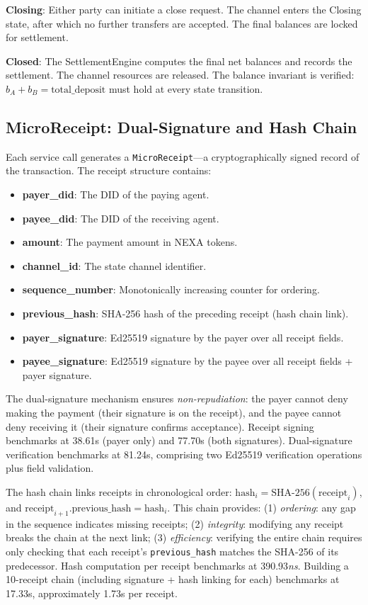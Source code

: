 \textbf{Closing}: Either party can initiate a close request. The channel enters the Closing state, after which no further transfers are accepted. The final balances are locked for settlement.

\textbf{Closed}: The SettlementEngine computes the final net balances and records the settlement. The channel resources are released. The balance invariant is verified: $b_A + b_B = \text{total\_deposit}$ must hold at every state transition.

\subsection{MicroReceipt: Dual-Signature and Hash Chain}

Each service call generates a \texttt{MicroReceipt}---a cryptographically signed record of the transaction. The receipt structure contains:

\begin{itemize}
  \item \textbf{payer\_did}: The DID of the paying agent.
  \item \textbf{payee\_did}: The DID of the receiving agent.
  \item \textbf{amount}: The payment amount in NEXA tokens.
  \item \textbf{channel\_id}: The state channel identifier.
  \item \textbf{sequence\_number}: Monotonically increasing counter for ordering.
  \item \textbf{previous\_hash}: SHA-256 hash of the preceding receipt (hash chain link).
  \item \textbf{payer\_signature}: Ed25519 signature by the payer over all receipt fields.
  \item \textbf{payee\_signature}: Ed25519 signature by the payee over all receipt fields + payer signature.
\end{itemize}

The dual-signature mechanism ensures \emph{non-repudiation}: the payer cannot deny making the payment (their signature is on the receipt), and the payee cannot deny receiving it (their signature confirms acceptance). Receipt signing benchmarks at 38.61\textmu s (payer only) and 77.70\textmu s (both signatures). Dual-signature verification benchmarks at 81.24\textmu s, comprising two Ed25519 verification operations plus field validation.

The hash chain links receipts in chronological order: $\text{hash}_i = \text{SHA-256}(\text{receipt}_i)$, and $\text{receipt}_{i+1}.\text{previous\_hash} = \text{hash}_i$. This chain provides: (1) \emph{ordering}: any gap in the sequence indicates missing receipts; (2) \emph{integrity}: modifying any receipt breaks the chain at the next link; (3) \emph{efficiency}: verifying the entire chain requires only checking that each receipt's \texttt{previous\_hash} matches the SHA-256 of its predecessor. Hash computation per receipt benchmarks at 390.93\textit{ns}. Building a 10-receipt chain (including signature + hash linking for each) benchmarks at 17.33\textmu s, approximately 1.73\textmu s per receipt.

